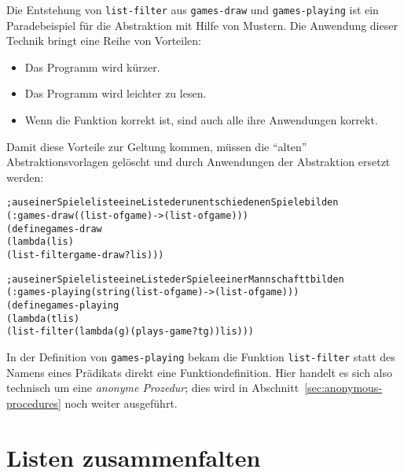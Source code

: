 Die Entstehung von \texttt{list-filter} aus \texttt{games-draw} und
\texttt{games-playing} ist ein Paradebeispiel für die Abstraktion mit
Hilfe von Mustern.  Die Anwendung dieser Technik bringt eine Reihe von
Vorteilen:
%
\begin{itemize}
\item Das Programm wird kürzer.
\item Das Programm wird leichter zu lesen.
\item Wenn die Funktion korrekt ist, sind auch alle ihre Anwendungen
  korrekt.
\end{itemize}
%
Damit diese Vorteile zur Geltung kommen, müssen die "`alten"'
Abstraktionsvorlagen gelöscht und durch Anwendungen der Abstraktion
ersetzt werden:
%
\begin{alltt}
; aus einer Spieleliste eine Liste der unentschiedenen Spiele bilden
(: games-draw ((list-of game) -> (list-of game)))
(define games-draw
  (lambda (lis)
    (list-filter game-draw? lis)))

; aus einer Spieleliste eine Liste der Spiele einer Mannschaft t bilden
(: games-playing (string (list-of game) -> (list-of game)))
(define games-playing
  (lambda (t lis)
    (list-filter (lambda (g) (plays-game? t g)) lis)))
\end{alltt}
%
In der Definition von \texttt{games-playing} bekam die Funktion
\texttt{list-filter} statt des Namens eines Prädikats direkt eine
Funktiondefinition.  Hier handelt es sich also technisch um eine \emph{anonyme
  Prozedur}; dies wird in Abschnitt~\ref{sec:anonymous-procedures} noch weiter ausgeführt.

\section{Listen zusammenfalten}

